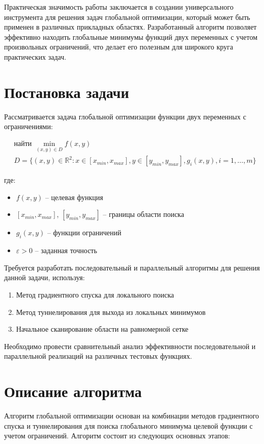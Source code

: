 \documentclass[12pt]{article}
\begin{document}
Практическая значимость работы заключается в создании универсального инструмента для решения задач глобальной оптимизации, который может быть применен в различных прикладных областях. Разработанный алгоритм позволяет эффективно находить глобальные минимумы функций двух переменных с учетом произвольных ограничений, что делает его полезным для широкого круга практических задач.
\newpage

\section{Постановка задачи}
Рассматривается задача глобальной оптимизации функции двух переменных с ограничениями:

\begin{equation}
\begin{aligned}
& \text{найти } \min_{(x,y) \in D} f(x,y) \\
& D = \{(x,y) \in \mathbb{R}^2: x \in [x_{min}, x_{max}], y \in [y_{min}, y_{max}], g_i(x,y), i=1,\ldots,m\}
\end{aligned}
\end{equation}

где:
\begin{itemize}
    \item $f(x,y)$ -- целевая функция
    \item $[x_{min}, x_{max}]$, $[y_{min}, y_{max}]$ -- границы области поиска
    \item $g_i(x,y)$ -- функции ограничений
    \item $\varepsilon > 0$ -- заданная точность
\end{itemize}

Требуется разработать последовательный и параллельный алгоритмы для решения данной задачи, используя:
\begin{enumerate}
    \item Метод градиентного спуска для локального поиска
    \item Метод туннелирования для выхода из локальных минимумов
    \item Начальное сканирование области на равномерной сетке
\end{enumerate}

Необходимо провести сравнительный анализ эффективности последовательной и параллельной реализаций на различных тестовых функциях.
\newpage

\section{Описание алгоритма}
Алгоритм глобальной оптимизации основан на комбинации методов градиентного спуска и туннелирования для поиска глобального минимума целевой функции с учетом ограничений. Алгоритм состоит из следующих основных этапов:
\end{document}
